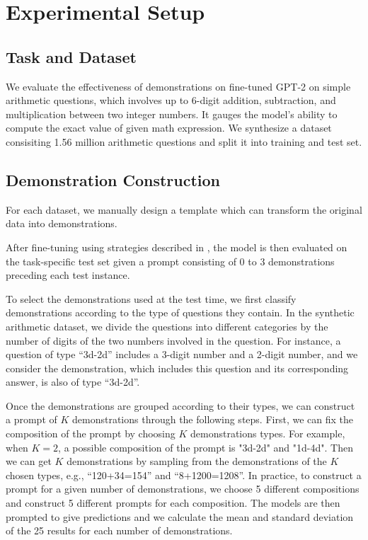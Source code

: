 \section{Experimental Setup}
\label{sec:approach}



\subsection{Task and Dataset}
We evaluate the effectiveness of demonstrations on fine-tuned GPT-2 on 
simple arithmetic questions, which involves up to 
6-digit addition, subtraction, and multiplication between two integer numbers. It gauges the model's ability to compute the exact value of given math expression. 
We synthesize a dataset consisiting 1.56 million arithmetic questions and split it into training and test set. 


\subsection{Demonstration Construction}
For each dataset, we manually design a template which can transform the original data into demonstrations. 

After fine-tuning using strategies described in , the model is then evaluated on the task-specific test set given a prompt consisting of 0 to 3 demonstrations preceding each test instance.

To select the demonstrations used at the test time, we first classify demonstrations according to the type of questions they contain. In the synthetic arithmetic dataset, we divide the questions into different categories by the number of digits of the two numbers involved in the question. For instance,  a question of type ``3d-2d'' includes a 3-digit number and a 2-digit number, and we consider the demonstration, 
which includes this question and its corresponding answer, is also of type ``3d-2d''. 

Once the demonstrations are grouped according to their types, we can construct a prompt of $K$ demonstrations through the following steps. First, we can fix the composition of the prompt by choosing $K$ demonstrations types. For example, when $K=2$, a possible composition of the prompt is "3d-2d" and "1d-4d". Then we can get $K$ demonstrations by sampling from the demonstrations of the $K$ chosen types, e.g., ``120+34=154'' and ``8+1200=1208''. In practice, to construct a prompt for a given number of demonstrations, we choose 5 different compositions and construct 5 different prompts for each composition. The models are then prompted to give predictions and we calculate the mean and standard deviation of the 25 results for each number of demonstrations.

